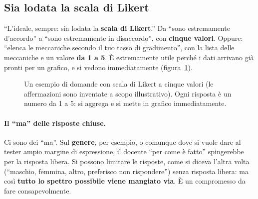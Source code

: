 \subsection{Sia lodata la scala di Likert}

``L'ideale, sempre: sia lodata la \textbf{scala di Likert}.'' Da ``sono
estremamente d'accordo'' a ``sono estremamente in disaccordo'', con
\textbf{cinque valori}. Oppure: ``elenca le meccaniche secondo il tuo tasso
di gradimento'', con la lista delle meccaniche e un valore \textbf{da 1 a 5}.
È estremamente utile perché i dati arrivano già pronti per un grafico, e si
vedono immediatamente (figura~\ref{gd10:fig:likert}).

\begin{figure}[htbp]
  \centering
  \caption{Un esempio di domande con scala di Likert a cinque valori (le
  affermazioni sono inventate a scopo illustrativo). Ogni risposta è un
  numero da 1 a 5: si aggrega e si mette in grafico immediatamente.}
  \label{gd10:fig:likert}
\end{figure}

\paragraph{Il ``ma'' delle risposte chiuse.} Ci sono dei ``ma''. Sul
\textbf{genere}, per esempio, o comunque dove si vuole dare al tester ampio
margine di espressione, il docente ``per come è fatto'' spingerebbe per la
risposta libera. Si possono limitare le risposte, come si diceva l'altra
volta (``maschio, femmina, altro, preferisco non rispondere'') senza
risposta libera: ma così \textbf{tutto lo spettro possibile viene mangiato
via}. È un compromesso da fare consapevolmente.

